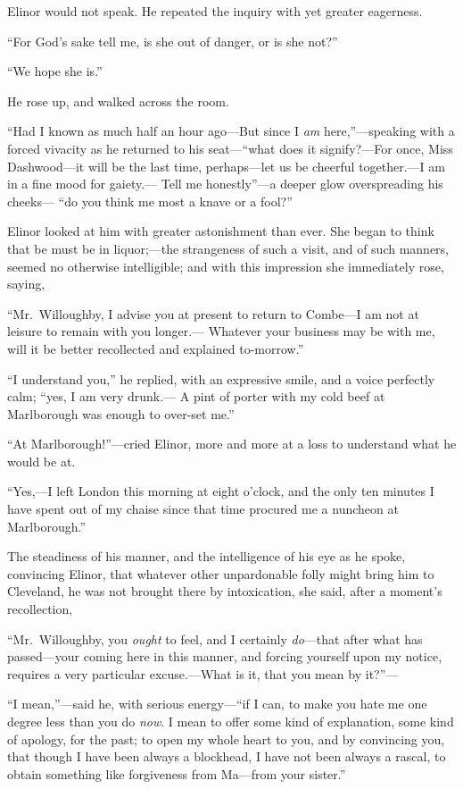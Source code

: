 Elinor would not speak.  He repeated the inquiry with
yet greater eagerness.

``For God's sake tell me, is she out of danger, or is she not?''

``We hope she is.''

He rose up, and walked across the room.

``Had I known as much half an hour ago---But
since I \emph{am} here,''---speaking with a forced vivacity as he
returned to his seat---``what does it signify?---For once,
Miss Dashwood---it will be the last time, perhaps---let us
be cheerful together.---I am in a fine mood for gaiety.---%
Tell me honestly''---a deeper glow overspreading his cheeks---%
``do you think me most a knave or a fool?''

Elinor looked at him with greater astonishment than ever.
She began to think that be must be in liquor;---the
strangeness of such a visit, and of such manners,
seemed no otherwise intelligible; and with this impression
she immediately rose, saying,

``Mr.\ Willoughby, I advise you at present to return
to Combe---I am not at leisure to remain with you longer.---%
Whatever your business may be with me, will it be better
recollected and explained to-morrow.''

``I understand you,'' he replied, with an expressive smile,
and a voice perfectly calm; ``yes, I am very drunk.---%
A pint of porter with my cold beef at Marlborough was
enough to over-set me.''

``At Marlborough!''---cried Elinor, more and more at
a loss to understand what he would be at.

``Yes,---I left London this morning at eight o'clock,
and the only ten minutes I have spent out of my chaise
since that time procured me a nuncheon at Marlborough.''

The steadiness of his manner, and the intelligence
of his eye as he spoke, convincing Elinor, that whatever
other unpardonable folly might bring him to Cleveland,
he was not brought there by intoxication, she said,
after a moment's recollection,

``Mr.\ Willoughby, you \emph{ought} to feel, and I certainly
\emph{do}---that after what has passed---your coming here in
this manner, and forcing yourself upon my notice,
requires a very particular excuse.---What is it,
that you mean by it?''---%

``I mean,''---said he, with serious energy---``if I can,
to make you hate me one degree less than you do \emph{now}.
I mean to offer some kind of explanation, some kind
of apology, for the past; to open my whole heart to you,
and by convincing you, that though I have been always
a blockhead, I have not been always a rascal, to obtain
something like forgiveness from Ma---from your sister.''

